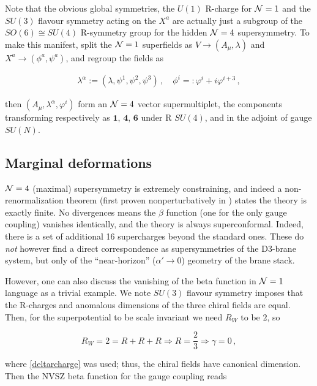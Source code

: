 Note that the obvious global symmetries, the $U(1)$ R-charge for $\mathcal{N} = 1$ and the $SU(3)$ flavour symmetry acting on the $X^a$ are actually just a subgroup of the $SO(6) \cong SU(4)$ R-symmetry group for the hidden $\mathcal{N} = 4$ supersymmetry. To make this manifest, split the $\mathcal{N}=1$ superfields as $V \rightarrow (A_\mu,\lambda)$ and $X^a \rightarrow (\phi^a,\psi^a)$, and regroup the fields as

\begin{align}
	\lambda^\alpha := (\lambda,\psi^1,\psi^2,\psi^3)\,,\quad \phi^i =: \varphi^i + i \varphi^{i+3}\,,
	\label{}
\end{align}

then $(A_\mu,\lambda^\alpha,\varphi^i)$ form an $\mathcal{N}=4$ vector supermultiplet, the components transforming respectively as $\mathbf{1}$, $\mathbf{4}$, $\mathbf{6}$ under R $SU(4)$, and in the adjoint of gauge $SU(N)$.

\subsection{Marginal deformations}

$\mathcal{N} = 4$ (maximal) supersymmetry is extremely constraining, and indeed a non-renormalization theorem (first proven nonperturbatively in \cite{seibergnr}) states the theory is exactly finite. No divergences means the $\beta$ function (one for the only gauge coupling) vanishes identically, and the theory is always superconformal. Indeed, there is a set of additional 16 supercharges beyond the standard ones. These do \emph{not} however find a direct correspondence as supersymmetries of the D3-brane system, but only of the ``near-horizon'' ($\alpha' \rightarrow 0$) geometry of the brane stack.

However, one can also discuss the vanishing of the beta function in $\mathcal{N} = 1$ language as a trivial example. We note $SU(3)$ flavour symmetry imposes that the R-charges and anomalous dimensions of the three chiral fields are equal. Then, for the superpotential to be scale invariant we need $R_W$ to be $2$, so

\begin{equation}
	R_W = 2 = R + R + R \Rightarrow R = \frac{2}{3} \Rightarrow \gamma = 0\,,
	\label{}
\end{equation}

where \eqref{deltarcharge} was used; thus, the chiral fields have canonical dimension. Then the NVSZ beta function for the gauge coupling reads

